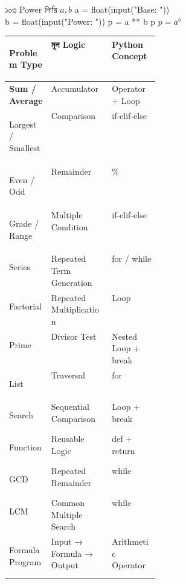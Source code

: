 
\formulaexercise
{১০৩}
{Power নির্ণয়}
{\(a,b\)}
{a = float(input("Base: "))\\
b = float(input("Power: "))}
{p = a ** b}
{p}
{\(p=a^b\)}




\begin{tabularx}{\linewidth}{
|>{\bfseries\RaggedRight\arraybackslash}p{0.29\linewidth}
|Y
|Y|
}

\hline
{}

\textbf{Problem Type}
&
\textbf{মূল Logic}
&
\textbf{Python Concept}
\\
\hline

Sum / Average
&
Accumulator
&
Operator + Loop
\\
\hline

Largest / Smallest
&
Comparison
&
if-elif-else
\\
\hline

Even / Odd
&
Remainder
&
\textenglish{\ttfamily \%}
\\
\hline

Grade / Range
&
Multiple Condition
&
if-elif-else
\\
\hline

Series
&
Repeated Term Generation
&
for / while
\\
\hline

Factorial
&
Repeated Multiplication
&
Loop
\\
\hline

Prime
&
Divisor Test
&
Nested Loop + break
\\
\hline

List
&
Traversal
&
for
\\
\hline

Search
&
Sequential Comparison
&
Loop + break
\\
\hline

Function
&
Reusable Logic
&
def + return
\\
\hline

GCD
&
Repeated Remainder
&
while
\\
\hline

LCM
&
Common Multiple Search
&
while
\\
\hline

Formula Program
&
Input → Formula → Output
&
Arithmetic Operator
\\
\hline

\end{tabularx}

